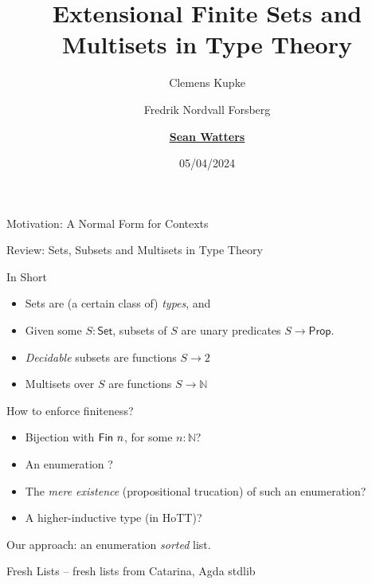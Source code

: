 \documentclass[handout]{beamer}
\title[Extenensional Fin. Sets \& Multisets in TT]{Extensional Finite Sets and Multisets in Type Theory}
\author[S. Watters]{Clemens Kupke \and Fredrik Nordvall Forsberg \and \underline{\textbf{Sean Watters}}}
\institute{University of Strathclyde}
\date{05/04/2024}
\begin{document}
\begin{frame}
  \titlepage{}
\end{frame}


\begin{frame}{Motivation: A Normal Form for Contexts}
%
%
\end{frame}


\begin{frame}{Review: Sets, Subsets and Multisets in Type Theory}
\begin{block}{In Short}
\begin{itemize}
\item Sets are (a certain class of) \emph{types}, and
\item Given some $S : \mathsf{Set}$, subsets of $S$ are unary predicates $S \to \mathsf{Prop}$.
\item \emph{Decidable} subsets are functions $S \to 2$
\item Multisets over $S$ are functions $S \to \mathbb{N}$
\end{itemize}
\end{block}

\begin{block}{How to enforce finiteness?}
\begin{itemize}
\item Bijection with $\AgdaDatatype{Fin}~n$, for some $n : \mathbb{N}$?
\item An enumeration ?
\item The \emph{mere existence} (propositional trucation) of such an enumeration?
\item A higher-inductive type (in HoTT)?
\end{itemize}
\end{block}

\begin{center}
Our approach: an enumeration \emph{sorted} list.
\end{center}
\end{frame}


\begin{frame}{Fresh Lists}
-- fresh lists from Catarina, Agda stdlib
\end{frame}
\end{document}
